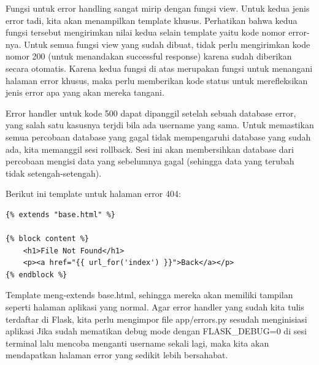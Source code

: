Fungsi untuk error handling sangat mirip dengan fungsi view. Untuk kedua jenis error tadi, kita akan menampilkan template khusus. Perhatikan bahwa kedua fungsi tersebut mengirimkan nilai kedua selain template yaitu kode nomor error-nya. Untuk semua fungsi view yang sudah dibuat, tidak perlu mengirimkan kode nomor 200 (untuk menandakan successful response) karena sudah diberikan secara otomatis.
Karena kedua fungsi di atas merupakan fungsi untuk menangani halaman error khusus, maka  perlu memberikan kode status untuk merefleksikan jenis error apa yang akan mereka tangani.

Error handler untuk kode 500 dapat dipanggil setelah sebuah database error, yang salah satu kasusnya terjdi bila ada username yang sama. Untuk memastikan semua percobaan database yang gagal tidak mempengaruhi database yang sudah ada, kita memanggil sesi rollback. Sesi ini akan membersihkan database dari percobaan mengisi data yang sebelumnya gagal (sehingga data yang terubah tidak setengah-setengah).

Berikut ini template untuk halaman error 404:
\begin{verbatim}
{% extends "base.html" %}

{% block content %}
    <h1>File Not Found</h1>
    <p><a href="{{ url_for('index') }}">Back</a></p>
{% endblock %}
 \end{verbatim}
Template meng-extends base.html, sehingga mereka akan memiliki tampilan seperti halaman aplikasi yang normal. 
Agar error handler yang sudah kita tulis terdaftar di Flask, kita perlu mengimpor file app/errors.py sesudah menginisiasi aplikasi
Jika sudah mematikan debug mode dengan FLASK_DEBUG=0 di sesi terminal lalu mencoba menganti username sekali lagi, maka kita akan mendapatkan halaman error yang sedikit lebih bersahabat.

